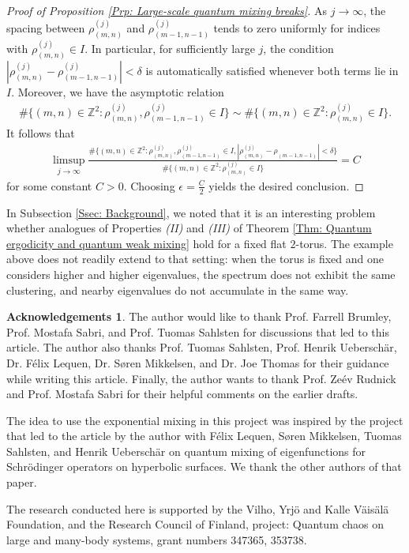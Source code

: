 \documentclass[11pt,twoside,reqno]{amsart} \usepackage{a4wide} \usepackage[T1]{fontenc} \usepackage[utf8]{inputenc} \usepackage{soul}  \usepackage{amsmath} \usepackage{amsfonts} \usepackage{amssymb} \usepackage{mathtools} \usepackage{amsthm} \usepackage{xcolor} \usepackage{graphicx} \usepackage{hyperref} \usepackage{standalone} \usepackage{esint} \usepackage{comment} \usepackage[left=2.3cm,top=3cm,right=2.3cm]{geometry} \usepackage{bm} \usepackage{svg} \usepackage{float} \numberwithin{equation}{section} \theoremstyle{plain} \newtheorem{thm}{Theorem}[section] \newtheorem{theorem}[thm]{Theorem} \newtheorem*{theorem*}{Theorem}\newtheorem{conj}[thm]{Conjecture} \newtheorem{lemma}[thm]{Lemma} \newtheorem{prop}[thm]{Proposition} \newtheorem{proposition}[thm]{Proposition} \newtheorem{cor}[thm]{Corollary} \newtheorem{question}[thm]{Question} \newtheorem{corollary}[thm]{Corollary} \newtheorem{assumption}[thm]{Assumption} \theoremstyle{definition} \newtheorem{defn}[thm]{Definition} \newtheorem{choice}[thm]{Choice} \newtheorem{definition}[thm]{Definition} \newtheorem{ex}[thm]{Example} \newtheorem{notation}[thm]{Notation} \newtheorem*{ack}{Acknowledgements} \theoremstyle{remark} \newtheorem{remark}[thm]{Remark} \newtheorem{bigremark}[thm]{Remark} \usepackage{xcolor} \newcommand{\red}[1]{ {\color{Red}#1} } \newcommand{\blue}[1]{ {\color{Blue}#1} } \author{Kai Hippi} \address{Aalto University, Espoo, Finland} \email{kai.hippi@aalto.fi}
\begin{document}
\begin{proof}[Proof of Proposition \ref{Prp: Large-scale quantum mixing breaks}]
	As $ j \to \infty $, the spacing between $\rho_{( m,n )}^{( j )}$ and $\rho_{( m-1,n-1 )}^{( j )}$ tends to zero uniformly for indices with $\rho_{( m,n )}^{( j )} \in I$. In particular, for sufficiently large $ j $, the condition $ | \rho_{( m,n )}^{( j )} - \rho_{( m-1,n-1 )}^{( j )} | < \delta $ is automatically satisfied whenever both terms lie in $ I $. Moreover, we have the asymptotic relation
	\begin{align*}
		\# \{ ( m,n ) \in \mathbb{Z}^{2} : \rho_{( m,n )}^{( j )}, \rho_{( m-1,n-1 )}^{( j )} \in I \} \sim \# \{ ( m,n ) \in \mathbb{Z}^{2} : \rho_{( m,n )}^{( j )} \in I \}.
	\end{align*}
	It follows that
	\begin{align*}
		\limsup_{ j \to \infty } \frac{ \# \{ ( m,n ) \in \mathbb{Z}^{2} : \rho_{( m,n )}^{( j )}, \rho_{( m-1,n-1 )}^{( j )} \in I, | \rho_{( m,n )}^{( j )} - \rho_{( m-1,n-1 )} | < \delta \} }{ \# \{ ( m,n ) \in \mathbb{Z}^{2} : \rho_{( m,n )}^{( j )} \in I \} } = C
	\end{align*}
	for some constant $ C > 0 $. Choosing $ \epsilon = \tfrac{C}{2} $ yields the desired conclusion.

\end{proof}

In Subsection \ref{Ssec: Background}, we noted that it is an interesting problem whether analogues of Properties \emph{(II)} and \emph{(III)} of Theorem \ref{Thm: Quantum ergodicity and quantum weak mixing} hold for a fixed flat $ 2 $-torus. The example above does not readily extend to that setting: when the torus is fixed and one considers higher and higher eigenvalues, the spectrum does not exhibit the same clustering, and nearby eigenvalues do not accumulate in the same way.

\begin{ack}

The author would like to thank Prof. Farrell Brumley, Prof. Mostafa Sabri, and Prof. Tuomas Sahlsten  for discussions that led to this article. The author also thanks Prof. Tuomas Sahlsten, Prof. Henrik Ueberschär, Dr. F\'{e}lix Lequen, Dr. Søren Mikkelsen, and Dr. Joe Thomas for their guidance while writing this article. Finally, the author wants to thank Prof. Ze\'ev Rudnick and Prof. Mostafa Sabri for their helpful comments on the earlier drafts.

The idea to use the exponential mixing in this project was inspired by the project that led to the article \cite{HLMSU26} by the author with F{\'e}lix Lequen, S{\o}ren Mikkelsen, Tuomas Sahlsten, and Henrik Ueberschär on quantum mixing of eigenfunctions for Schrödinger operators on hyperbolic surfaces. We thank the other authors of that paper.

The research conducted here is supported by the Vilho, Yrjö and Kalle Väisälä Foundation, and the Research Council of Finland, project: Quantum chaos on large and many-body systems, grant numbers 347365, 353738.

\end{ack}



\end{document}
